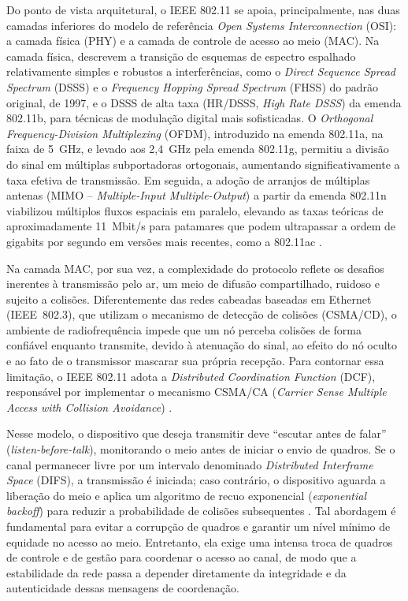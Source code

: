 Do ponto de vista arquitetural, o IEEE 802.11 se apoia, principalmente, nas duas camadas inferiores do modelo de referência \textit{Open Systems Interconnection} (OSI): a camada física (PHY) e a camada de controle de acesso ao meio (MAC). Na camada física,  descrevem a transição de esquemas de espectro espalhado relativamente simples e robustos a interferências, como o \textit{Direct Sequence Spread Spectrum} (DSSS) e o \textit{Frequency Hopping Spread Spectrum} (FHSS) do padrão original, de 1997, e o DSSS de alta taxa (HR/DSSS, \textit{High Rate DSSS}) da emenda 802.11b, para técnicas de modulação digital mais sofisticadas. O \textit{Orthogonal Frequency-Division Multiplexing} (OFDM), introduzido na emenda 802.11a, na faixa de 5~GHz, e levado aos 2,4~GHz pela emenda 802.11g, permitiu a divisão do sinal em múltiplas subportadoras ortogonais, aumentando significativamente a taxa efetiva de transmissão. Em seguida, a adoção de arranjos de múltiplas antenas (MIMO – \textit{Multiple-Input Multiple-Output}) a partir da emenda 802.11n viabilizou múltiplos fluxos espaciais em paralelo, elevando as taxas teóricas de aproximadamente 11~Mbit/s para patamares que podem ultrapassar a ordem de gigabits por segundo em versões mais recentes, como a 802.11ac \cite{Hiertz2010}.

Na camada MAC, por sua vez, a complexidade do protocolo reflete os desafios inerentes à transmissão pelo ar, um meio de difusão compartilhado, ruidoso e sujeito a colisões. Diferentemente das redes cabeadas baseadas em Ethernet (IEEE~802.3), que utilizam o mecanismo de detecção de colisões (CSMA/CD), o ambiente de radiofrequência impede que um nó perceba colisões de forma confiável enquanto transmite, devido à atenuação do sinal, ao efeito do nó oculto e ao fato de o transmissor mascarar sua própria recepção. Para contornar essa limitação, o IEEE 802.11 adota a \textit{Distributed Coordination Function} (DCF), responsável por implementar o mecanismo CSMA/CA (\textit{Carrier Sense Multiple Access with Collision Avoidance}) \cite{Hiertz2010}.

Nesse modelo, o dispositivo que deseja transmitir deve “escutar antes de falar” (\textit{listen-before-talk}), monitorando o meio antes de iniciar o envio de quadros. Se o canal permanecer livre por um intervalo denominado \textit{Distributed Interframe Space} (DIFS), a transmissão é iniciada; caso contrário, o dispositivo aguarda a liberação do meio e aplica um algoritmo de recuo exponencial (\textit{exponential backoff}) para reduzir a probabilidade de colisões subsequentes \cite{Hiertz2010}. Tal abordagem é fundamental para evitar a corrupção de quadros e garantir um nível mínimo de equidade no acesso ao meio. Entretanto, ela exige uma intensa troca de quadros de controle e de gestão para coordenar o acesso ao canal, de modo que a estabilidade da rede passa a depender diretamente da integridade e da autenticidade dessas mensagens de coordenação.

